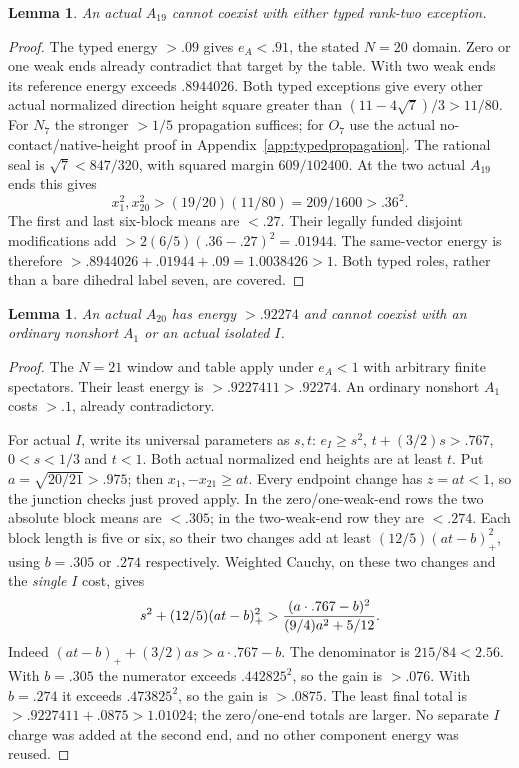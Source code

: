 \documentclass[11pt]{article}
\newtheorem{lemma}[theorem]{Lemma}
\theoremstyle{definition}
\theoremstyle{remark}
\begin{document}
\begin{lemma}
\label{app:tail:lem:A19typed}
An actual $A_{19}$ cannot coexist with either typed rank-two exception.
\end{lemma}
\begin{proof}
The typed energy $>.09$ gives $e_A<.91$, the stated $N=20$ domain.
Zero or one weak ends already contradict that target by the table.
With two weak ends its reference energy exceeds $.8944026$.
Both typed exceptions give every other actual normalized direction
height square greater than $(11-4\sqrt7)/3>11/80$.
For $N_7$ the stronger $>1/5$ propagation suffices; for $O_7$ use
the actual no-contact/native-height proof in
Appendix~\ref{app:typedpropagation}. The rational seal is
$\sqrt7<847/320$, with squared margin $609/102400$.
At the two actual $A_{19}$ ends this gives
\[
 x_1^2,x_{20}^2>(19/20)(11/80)=209/1600>.36^2.
\]
The first and last six-block means are $<.27$. Their legally
funded disjoint modifications add $>2(6/5)(.36-.27)^2=.01944$.
The same-vector energy is therefore
$>.8944026+.01944+.09=1.0038426>1$.
Both typed roles, rather than a bare dihedral label seven, are covered.
\end{proof}

\begin{lemma}
\label{app:tail:lem:A20A1}
An actual $A_{20}$ has energy $>.92274$ and cannot coexist with
an ordinary nonshort $A_1$ or an actual isolated $I$.
\end{lemma}
\begin{proof}
The $N=21$ window and table apply under $e_A<1$ with arbitrary
finite spectators. Their least energy is $>.9227411>.92274$.
An ordinary nonshort $A_1$ costs $>.1$, already contradictory.

For actual $I$, write its universal parameters as $s,t$:
$e_I\ge s^2$, $t+(3/2)s>.767$, $0<s<1/3$ and $t<1$.
Both actual normalized end heights are at least $t$. Put
$a=\sqrt{20/21}>.975$; then $x_1,-x_{21}\ge at$.
Every endpoint change has $z=at<1$, so the junction checks just
proved apply. In the zero/one-weak-end rows the two absolute block
means are $<.305$; in the two-weak-end row they are $<.274$.
Each block length is five or six, so their two changes add at least
$(12/5)(at-b)_+^2$, using $b=.305$ or $.274$ respectively.
Weighted Cauchy, on these two changes and the \emph{single} $I$ cost,
gives
\[
 s^2+(12/5)(at-b)_+^2>
 {(a\cdot.767-b)^2\over(9/4)a^2+5/12}.
\]
Indeed $(at-b)_++(3/2)as>a\cdot.767-b$.
The denominator is $215/84<2.56$. With $b=.305$ the numerator
exceeds $.442825^2$, so the gain is $>.076$.
With $b=.274$ it exceeds $.473825^2$, so the gain is $>.0875$.
The least final total is $>.9227411+.0875>1.01024$;
the zero/one-end totals are larger. No separate $I$ charge was
added at the second end, and no other component energy was reused.
\end{proof}
\end{document}
